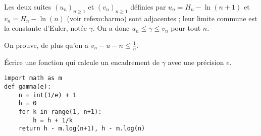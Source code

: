\begin{Exercise}[title= Constante d'Euler]

Les deux suites $(u_n)_{n\ge 1}$ et $(v_n)_{n\ge 1}$ définies par $u_n = H_n -\ln(n+1)$ et $v_n = H_n -\ln(n)$ (voir ref{exo:harmo}) sont adjacentes ; leur limite commune est la constante d'Euler, notée $\gamma$. On a donc $u_n \le \gamma \le v_n$ pour tout $n$.

On prouve, de plus qu'on a $v_n - u-n \le \frac 1n$.

Écrire une fonction  qui calcule un encadrement de $\gamma$ avec une précision $e$.
\end{Exercise}
\begin{Answer} 
\begin{lstlisting}
import math as m
def gamma(e):
    n = int(1/e) + 1
    h = 0
    for k in range(1, n+1):
        h = h + 1/k
    return h - m.log(n+1), h - m.log(n)
\end{lstlisting}
\end{Answer}
